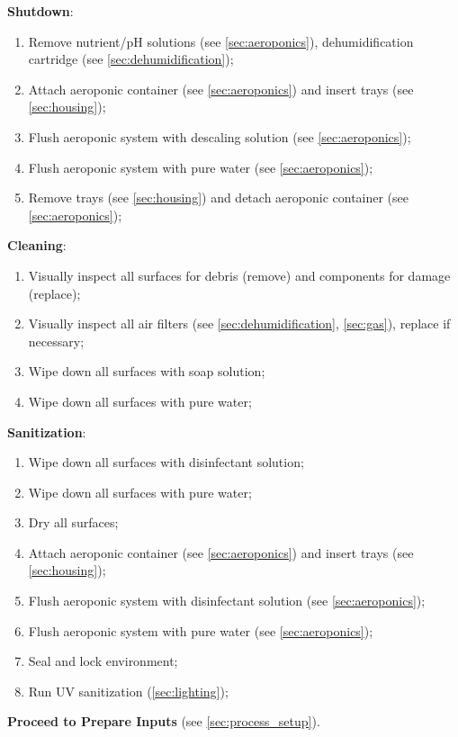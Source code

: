 \textbf{Shutdown}:
\begin{enumerate}
    \item Remove nutrient/pH solutions (see \ref{sec:aeroponics}), dehumidification cartridge (see \ref{sec:dehumidification});
    \item Attach aeroponic container (see \ref{sec:aeroponics}) and insert trays (see \ref{sec:housing});
    \item Flush aeroponic system with descaling solution (see \ref{sec:aeroponics});
    \item Flush aeroponic system with pure water (see \ref{sec:aeroponics});
    \item Remove trays (see \ref{sec:housing}) and detach aeroponic container (see \ref{sec:aeroponics});
\end{enumerate}

\textbf{Cleaning}:
\begin{enumerate}
    \item Visually inspect all surfaces for debris (remove) and components for damage (replace);
    \item Visually inspect all air filters (see \ref{sec:dehumidification}, \ref{sec:gas}), replace if necessary;
    \item Wipe down all surfaces with soap solution;
    \item Wipe down all surfaces with pure water;
\end{enumerate}

\textbf{Sanitization}:
\begin{enumerate}
    \item Wipe down all surfaces with disinfectant solution;
    \item Wipe down all surfaces with pure water;
    \item Dry all surfaces;
    \item Attach aeroponic container (see \ref{sec:aeroponics}) and insert trays (see \ref{sec:housing});
    \item Flush aeroponic system with disinfectant solution (see \ref{sec:aeroponics});
    \item Flush aeroponic system with pure water (see \ref{sec:aeroponics});
    \item Seal and lock environment;
    \item Run UV sanitization (\ref{sec:lighting});
\end{enumerate}

\textbf{Proceed to Prepare Inputs} (see \ref{sec:process_setup}).